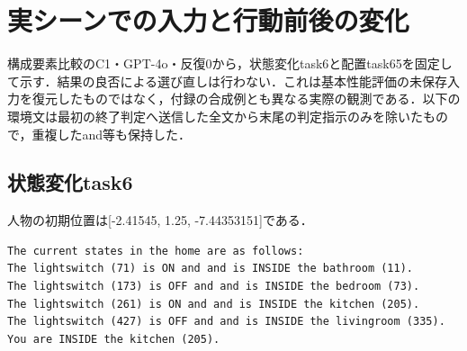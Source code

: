 \section{実シーンでの入力と行動前後の変化}\label{app:real_inputs}
構成要素比較のC1・GPT-4o・反復0から，状態変化task6と配置task65を固定して示す．結果の良否による選び直しは行わない．これは基本性能評価の未保存入力を復元したものではなく，付録の合成例とも異なる実際の観測である．以下の環境文は最初の終了判定へ送信した全文から末尾の判定指示のみを除いたもので，重複したand等も保持した．

\subsection{状態変化task6}
人物の初期位置は[-2.41545, 1.25, -7.44353151]である．
\begin{lstlisting}[basicstyle=\ttfamily\scriptsize,breaklines=true,caption={最初の判定へ送信した環境知識全文}]
The current states in the home are as follows: 
The lightswitch (71) is ON and and is INSIDE the bathroom (11).
The lightswitch (173) is OFF and and is INSIDE the bedroom (73).
The lightswitch (261) is ON and and is INSIDE the kitchen (205).
The lightswitch (427) is OFF and and is INSIDE the livingroom (335).
You are INSIDE the kitchen (205).

\end{lstlisting}
